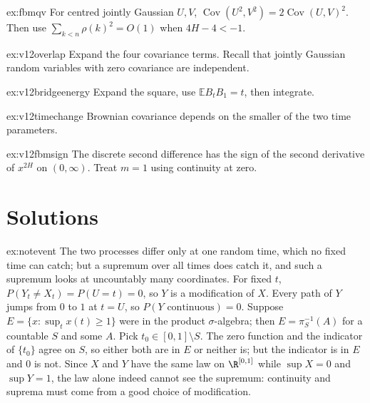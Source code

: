 \begin{hint}{ex:fbmqv}
For centred jointly Gaussian $U,V$, $\operatorname{Cov}(U^2,V^2)=2\operatorname{Cov}(U,V)^2$. Then use $\sum_{k<n}\rho(k)^2=O(1)$ when $4H-4<-1$.
\end{hint}

\begin{hint}{ex:v12overlap}
Expand the four covariance terms. Recall that jointly Gaussian random variables with zero covariance are independent.
\end{hint}

\begin{hint}{ex:v12bridgeenergy}
Expand the square, use $\mathbb EB_tB_1=t$, then integrate.
\end{hint}

\begin{hint}{ex:v12timechange}
Brownian covariance depends on the smaller of the two time parameters.
\end{hint}

\begin{hint}{ex:v12fbmsign}
The discrete second difference has the sign of the second derivative of $x^{2H}$ on $(0,\infty)$. Treat $m=1$ using continuity at zero.
\end{hint}

\section{Solutions}

\begin{solution}{ex:notevent}
\idea The two processes differ only at one random time, which no fixed time can catch; but a supremum over all times does catch it, and such a supremum looks at uncountably many coordinates.
\writeup For fixed $t$, $P(Y_t\neq X_t)=P(U=t)=0$, so $Y$ is a modification of $X$. Every path of $Y$ jumps from $0$ to $1$ at $t=U$, so $P(Y\text{ continuous})=0$. Suppose
$E=\{x:\sup_tx(t)\ge1\}$ were in the product $\sigma$-algebra; then $E=\pi_S^{-1}(A)$ for a countable $S$ and some $A$. Pick $t_0\in[0,1]\setminus S$. The zero function and the indicator of $\{t_0\}$ agree on $S$, so
either both are in $E$ or neither is; but the indicator is in $E$ and $0$ is not. Since $X$ and $Y$ have the same law on $\R^{[0,1]}$ while $\sup X=0$ and $\sup Y=1$, the law alone indeed cannot see the supremum: continuity and
suprema must come from a good choice of modification.
\end{solution}

